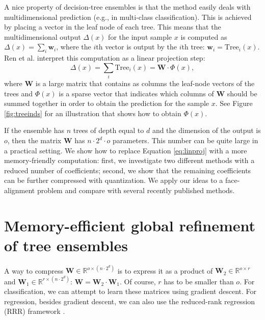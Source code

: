 \documentclass{article}
\begin{document}
	A nice property of decision-tree ensembles is that the method easily deals with multidimensional prediction
	(e.g., in multi-class classification).
	This is achieved by placing a vector in the leaf node of each tree.
	This means that the multidimensional output $\Delta(x)$ for the input sample $x$ is computed as $\Delta(x)=\sum_i\mathbf{w}_i$,
	where the $i$th vector is output by the $i$th tree: $\mathbf{w}_i=\text{Tree}_i(x)$.
	Ren et al. \cite{lbf,global} interpret this computation as a linear projection step:
	\begin{equation}\label{eq:linproj}
		\Delta(x)=
		\sum_i\text{Tree}_i(x)=
		\mathbf{W}\cdot\Phi(x)
		,
	\end{equation}
	where $\mathbf{W}$ is a large matrix that contains as columns the leaf-node vectors of the trees and $\Phi(x)$ is a sparse vector that indicates which columns of $\mathbf{W}$ should be summed together in order to obtain the prediction for the sample $x$.
	See Figure \ref{fig:treeinds} for an illustration that shows how to obtain $\Phi(x)$.
	

	If the ensemble has $n$ trees of depth equal to $d$ and the dimension of the output is $o$,
	then the matrix $\mathbf{W}$ has $n \cdot 2^d \cdot o$ parameters.
	This number can be quite large in a practical setting.
	We show how to replace Equation \eqref{eq:linproj} with a more memory-friendly computation:
	first, we investigate two different methods with a reduced number of coefficients;
	second, we show that the remaining coefficients can be further compressed with quantization.
	We apply our ideas to a face-alignment problem and compare with several recently published methods.

\section{Memory-efficient global refinement of tree ensembles}\label{sec:method}
	A way to compress $\mathbf{W}\in\mathbb{R}^{o\times(n\cdot 2^d)}$ is to express it as a product of $\mathbf{W}_2\in\mathbb{R}^{o\times r}$ and $\mathbf{W}_1\in\mathbb{R}^{r\times(n\cdot 2^d)}$:
	$\mathbf{W}=\mathbf{W}_2\cdot\mathbf{W}_1$.
	Of course, $r$ has to be smaller than $o$.
	For classification, we can attempt to learn these matrices using gradient descent.
	For regression, besides gradient descent, we can also use the reduced-rank regression (RRR) framework \cite{rrr}.
\end{document}
